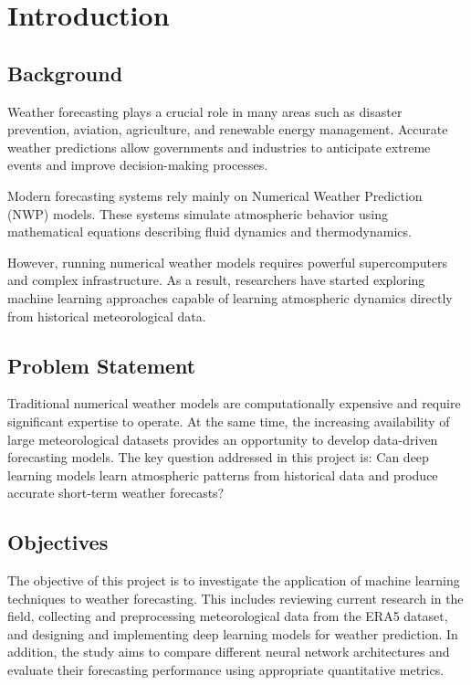\chapter{Introduction}
\label{chap:Introduction}

\section{Background}
Weather forecasting plays a crucial role in many areas such as disaster prevention, aviation, agriculture, and renewable energy management. Accurate weather predictions allow governments and industries to anticipate extreme events and improve decision-making processes.

Modern forecasting systems rely mainly on Numerical Weather Prediction (NWP) models. These systems simulate atmospheric behavior using mathematical equations describing fluid dynamics and thermodynamics.

However, running numerical weather models requires powerful supercomputers and complex infrastructure. As a result, researchers have started exploring machine learning approaches capable of learning atmospheric dynamics directly from historical meteorological data.

\section{Problem Statement}
Traditional numerical weather models are computationally expensive and require significant expertise to operate. At the same time, the increasing availability of large meteorological datasets provides an opportunity to develop data-driven forecasting models.
The key question addressed in this project is:
Can deep learning models learn atmospheric patterns from historical data and produce accurate short-term weather forecasts?


\section{Objectives}

The objective of this project is to investigate the application of machine learning techniques to weather forecasting. This includes reviewing current research in the field, collecting and preprocessing meteorological data from the ERA5 dataset, and designing and implementing deep learning models for weather prediction. In addition, the study aims to compare different neural network architectures and evaluate their forecasting performance using appropriate quantitative metrics.